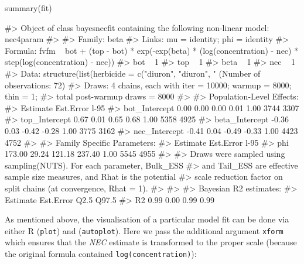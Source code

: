 \begin{Schunk}
\begin{Sinput}
summary(fit)
\end{Sinput}
\begin{Soutput}
#> Object of class bayesnecfit containing the following non-linear model: nec4param
#> 
#>  Family: beta 
#>   Links: mu = identity; phi = identity 
#> Formula: fvfm ~ bot + (top - bot) * exp(-exp(beta) * (log(concentration) - nec) * step(log(concentration) - nec)) 
#>          bot ~ 1
#>          top ~ 1
#>          beta ~ 1
#>          nec ~ 1
#>    Data: structure(list(herbicide = c("diuron", "diuron", " (Number of observations: 72) 
#>   Draws: 4 chains, each with iter = 10000; warmup = 8000; thin = 1;
#>          total post-warmup draws = 8000
#> 
#> Population-Level Effects: 
#>                Estimate Est.Error l-95%
#> bot_Intercept      0.00      0.00     0.00     0.01 1.00     3744     3307
#> top_Intercept      0.67      0.01     0.65     0.68 1.00     5358     4925
#> beta_Intercept    -0.36      0.03    -0.42    -0.28 1.00     3775     3162
#> nec_Intercept     -0.41      0.04    -0.49    -0.33 1.00     4423     4752
#> 
#> Family Specific Parameters: 
#>     Estimate Est.Error l-95%
#> phi   173.00     29.24   121.18   237.40 1.00     5545     4955
#> 
#> Draws were sampled using sampling(NUTS). For each parameter, Bulk_ESS
#> and Tail_ESS are effective sample size measures, and Rhat is the potential
#> scale reduction factor on split chains (at convergence, Rhat = 1).
#> 
#> 
#> Bayesian R2 estimates:
#>    Estimate Est.Error Q2.5 Q97.5
#> R2     0.99      0.00 0.99  0.99
\end{Soutput}
\end{Schunk}

As mentioned above, the visualisation of a particular model fit can be
done via either  R (\texttt{plot}) and 
(\texttt{autoplot}). Here we pass the additional argument \texttt{xform}
which ensures that the \emph{NEC} estimate is transformed to the proper
scale (because the original formula contained
\texttt{log(concentration)}):

\newpage

